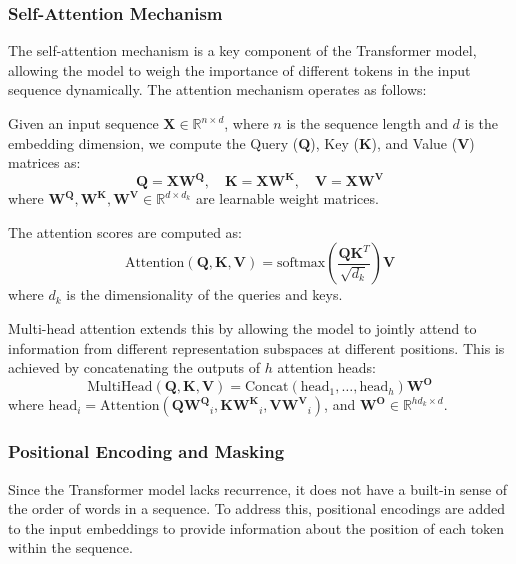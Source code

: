 \documentclass[a4paper, 11pt]{article}
\begin{document}
\subsubsection{Self-Attention Mechanism}

The self-attention mechanism is a key component of the Transformer model, allowing the model to weigh the importance of different tokens in the input sequence dynamically. The attention mechanism operates as follows:

Given an input sequence \(\mathbf{X} \in \mathbb{R}^{n \times d}\), where \(n\) is the sequence length and \(d\) is the embedding dimension, we compute the Query (\(\mathbf{Q}\)), Key (\(\mathbf{K}\)), and Value (\(\mathbf{V}\)) matrices as:
\begin{equation}
     \mathbf{Q} = \mathbf{X}\mathbf{W^Q}, \quad \mathbf{K} = \mathbf{XW^K}, \quad \mathbf{V} = \mathbf{XW^V}
\end{equation}
where \(\mathbf{W^Q}, \mathbf{W^K}, \mathbf{W^V} \in \mathbb{R}^{d \times d_k}\) are learnable weight matrices.

The attention scores are computed as:
\begin{equation}
    \text{Attention}(\mathbf{Q}, \mathbf{K}, \mathbf{V}) = \text{softmax}\left(\frac{\mathbf{Q}\mathbf{K}^T}{\sqrt{d_k}}\right)\mathbf{V}
\end{equation}
where \(d_k\) is the dimensionality of the queries and keys.

Multi-head attention extends this by allowing the model to jointly attend to information from different representation subspaces at different positions. This is achieved by concatenating the outputs of \(h\) attention heads:
\begin{equation}
    \text{MultiHead}(\mathbf{Q}, \mathbf{K}, \mathbf{V}) = \text{Concat}(\text{head}_1, \ldots, \text{head}_h)\mathbf{W^O}
\end{equation}
where \(\text{head}_i = \text{Attention}(\mathbf{Q}\mathbf{W^Q}_i, \mathbf{K}\mathbf{W^K}_i, \mathbf{V}\mathbf{W^V}_i)\), and \(\mathbf{W^O} \in \mathbb{R}^{hd_k \times d}\).

\subsubsection{Positional Encoding and Masking}

Since the Transformer model lacks recurrence, it does not have a built-in sense of the order of words in a sequence. To address this, positional encodings are added to the input embeddings to provide information about the position of each token within the sequence.
\end{document}
